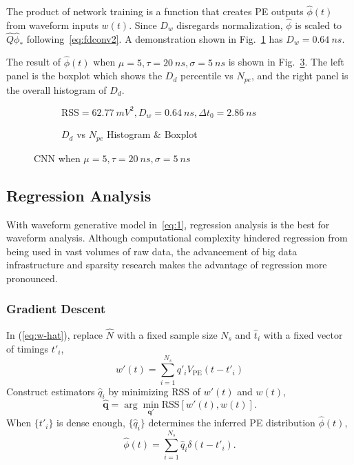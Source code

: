 The product of network training is a function that creates PE outputs $\hat{\phi}(t)$ from waveform inputs $w(t)$.  Since $D_w$ disregards normalization, $\hat{\phi}$ is scaled to $\hat{Q}\hat{\phi}_*$ following~\eqref{eq:fdconv2}. A demonstration shown in Fig.~\ref{fig:cnn} has $D_w = \SI{0.64}{ns}$. 

The result of $\hat{\phi}(t)$ when $\mu=5, \tau=\SI{20}{ns}, \sigma=\SI{5}{ns}$ is shown in Fig.~\ref{fig:cnn-npe}. The left panel is the boxplot which shows the $D_d$ percentile vs $N_{pe}$, and the right panel is the overall histogram of $D_d$. 

\begin{figure}[H]
  \begin{subfigure}{.5\textwidth}
    \centering
    \resizebox{\textwidth}{!}{}
    \caption{\label{fig:cnn}$\mathrm{RSS}=\SI{62.77}{mV^2},D_w=\SI{0.64}{ns},\Delta{t_0}=\SI{2.86}{ns}$}
  \end{subfigure}
  \begin{subfigure}{.5\textwidth}
    \centering
    \resizebox{\textwidth}{!}{}
    \caption{\label{fig:cnn-npe} $D_d$ vs $N_{pe}$ Histogram \& Boxplot}
  \end{subfigure}
  \caption{CNN when $\mu=5, \tau=\SI{20}{ns}, \sigma=\SI{5}{ns}$}
\end{figure}

\subsection{Regression Analysis}
With waveform generative model in~\eqref{eq:1}, regression analysis is the best for waveform analysis.  Although computational complexity hindered regression from being used in vast volumes of raw data, the advancement of big data infrastructure and sparsity research makes the advantage of regression more pronounced.

\subsubsection{Gradient Descent}
In (\ref{eq:w-hat}), replace $\hat{N}$ with a fixed sample size $N_s$ and $\hat{t}_i$ with a fixed vector of timings $t'_i$,
\begin{equation}
  \label{eq:gd}
  w'(t) = \sum_{i=1}^{N_s}q'_iV_\mathrm{PE}(t-t'_i)
\end{equation}
Construct estimators $\hat{q}_i$ by minimizing RSS of $w'(t)$ and $w(t)$,
\begin{equation}
  \label{eq:gd-q}
  \bm{\hat{q}} = \arg \underset{\bm{q'}}{\min} \mathrm{RSS}\left[w'(t),w(t)\right].
\end{equation}
When $\{t'_i\}$ is dense enough, $\{\hat{q}_i\}$ determines the inferred PE distribution $\hat{\phi}(t)$,
\begin{equation}
  \label{eq:gd-phi}
  \hat{\phi}(t) = \sum_{i=1}^{N_s}\hat{q}_i\delta(t-t'_i).
\end{equation}


